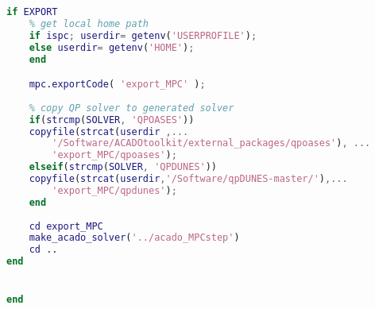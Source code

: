 \begin{lstlisting}[frame=single,language={Matlab},caption={MATLAB code for ACADO solver generation}]
if EXPORT
    % get local home path
    if ispc; userdir= getenv('USERPROFILE'); 
    else userdir= getenv('HOME'); 
    end

    mpc.exportCode( 'export_MPC' );
    
    % copy QP solver to generated solver
    if(strcmp(SOLVER, 'QPOASES'))
    copyfile(strcat(userdir ,...
        '/Software/ACADOtoolkit/external_packages/qpoases'), ...
        'export_MPC/qpoases');
    elseif(strcmp(SOLVER, 'QPDUNES'))
    copyfile(strcat(userdir,'/Software/qpDUNES-master/'),...
        'export_MPC/qpdunes');
    end
    
    cd export_MPC
    make_acado_solver('../acado_MPCstep')
    cd ..
end


end
\end{lstlisting}